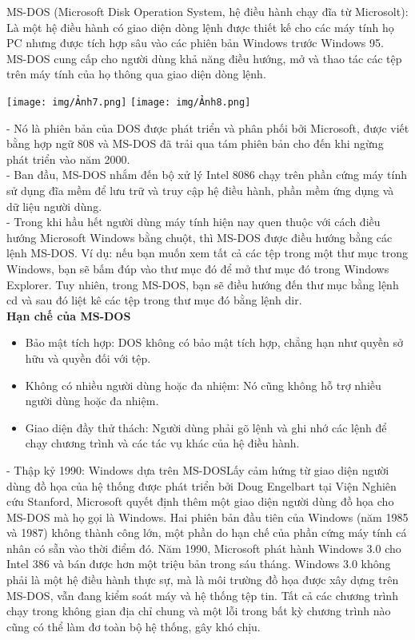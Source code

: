 \documentclass[12pt,a4paper]{article}
\begin{document}
MS-DOS (Microsoft Disk Operation System, hệ điều hành chạy đĩa từ Microsolt): Là một hệ điều hành có giao diện dòng lệnh được thiết kế cho các máy tính họ PC nhưng được tích hợp sâu vào các phiên bản Windows trước Windows 95.\\

MS-DOS cung cấp cho người dùng khả năng điều hướng, mở và thao tác các tệp trên máy tính của họ thông qua giao diện dòng lệnh.\\
\begin{center}
	\texttt{[image: img/Ảnh7.png]}
	\texttt{[image: img/Ảnh8.png]}
\end{center}
- Nó là phiên bản của DOS được phát triển và phân phối bởi Microsoft, được viết bằng hợp ngữ 808 và MS-DOS đã trải qua tám phiên bản cho đến khi ngừng phát triển vào năm 2000. \\

- Ban đầu, MS-DOS nhắm đến bộ xử lý Intel 8086 chạy trên phần cứng máy tính sử dụng đĩa mềm để lưu trữ và truy cập hệ điều hành, phần mềm ứng dụng và dữ liệu người dùng.\\

- Trong khi hầu hết người dùng máy tính hiện nay quen thuộc với cách điều hướng Microsoft Windows bằng chuột, thì MS-DOS được điều hướng bằng các lệnh MS-DOS. Ví dụ: nếu bạn muốn xem tất cả các tệp trong một thư mục trong Windows, bạn sẽ bấm đúp vào thư mục đó để mở thư mục đó trong Windows Explorer. Tuy nhiên, trong MS-DOS, bạn sẽ điều hướng đến thư mục bằng lệnh cd và sau đó liệt kê các tệp trong thư mục đó bằng lệnh dir.\\

\textbf{Hạn chế của MS-DOS}

\begin{itemize}
	\item Bảo mật tích hợp: DOS không có bảo mật tích hợp, chẳng hạn như quyền sở hữu và quyền đối với tệp.
	\item Không có nhiều người dùng hoặc đa nhiệm: Nó cũng không hỗ trợ nhiều người dùng hoặc đa nhiệm.
	\item Giao diện đầy thử thách: Người dùng phải gõ lệnh và ghi nhớ các lệnh để chạy chương trình và các tác vụ khác của hệ điều hành. 
\end{itemize}

- Thập kỷ 1990: Windows dựa trên MS-DOSLấy cảm hứng từ giao diện người dùng đồ họa của hệ thống được phát triển bởi Doug Engelbart tại Viện Nghiên cứu Stanford, Microsoft quyết định thêm một giao diện người dùng đồ họa cho MS-DOS mà họ gọi là Windows. Hai phiên bản đầu tiên của Windows (năm 1985 và 1987) không thành công lớn, một phần do hạn chế của phần cứng máy tính cá nhân có sẵn vào thời điểm đó. Năm 1990, Microsoft phát hành Windows 3.0 cho Intel 386 và bán được hơn một triệu bản trong sáu tháng. Windows 3.0 không phải là một hệ điều hành thực sự, mà là môi trường đồ họa được xây dựng trên MS-DOS, vẫn đang kiểm soát máy và hệ thống tệp tin. Tất cả các chương trình chạy trong không gian địa chỉ chung và một lỗi trong bất kỳ chương trình nào cũng có thể làm đơ toàn bộ hệ thống, gây khó chịu.\\
\end{document}
